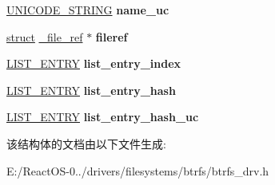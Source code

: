 \begin{DoxyCompactItemize}
\hyperlink{struct___u_n_i_c_o_d_e___s_t_r_i_n_g}{U\+N\+I\+C\+O\+D\+E\+\_\+\+S\+T\+R\+I\+NG} {\bfseries name\+\_\+uc}
\item 
\mbox{\label{structdir__child_abab9f695faea3539948ce2f1bc12d0f1}} 
\hyperlink{interfacestruct}{struct} \hyperlink{struct__file__ref}{\+\_\+file\+\_\+ref} $\ast$ {\bfseries fileref}
\item 
\mbox{\label{structdir__child_adb8debf0cbe1227a60b495d625f1eede}} 
\hyperlink{struct___l_i_s_t___e_n_t_r_y}{L\+I\+S\+T\+\_\+\+E\+N\+T\+RY} {\bfseries list\+\_\+entry\+\_\+index}
\item 
\mbox{\label{structdir__child_a6f3990c3609228156b63b130d3f25fe5}} 
\hyperlink{struct___l_i_s_t___e_n_t_r_y}{L\+I\+S\+T\+\_\+\+E\+N\+T\+RY} {\bfseries list\+\_\+entry\+\_\+hash}
\item 
\mbox{\label{structdir__child_a1ef50e27d3a218f304050f184e3f7077}} 
\hyperlink{struct___l_i_s_t___e_n_t_r_y}{L\+I\+S\+T\+\_\+\+E\+N\+T\+RY} {\bfseries list\+\_\+entry\+\_\+hash\+\_\+uc}
\end{DoxyCompactItemize}


该结构体的文档由以下文件生成\+:\begin{DoxyCompactItemize}
\item 
E\+:/\+React\+O\+S-\/0../drivers/filesystems/btrfs/btrfs\+\_\+drv.\+h\end{DoxyCompactItemize}
